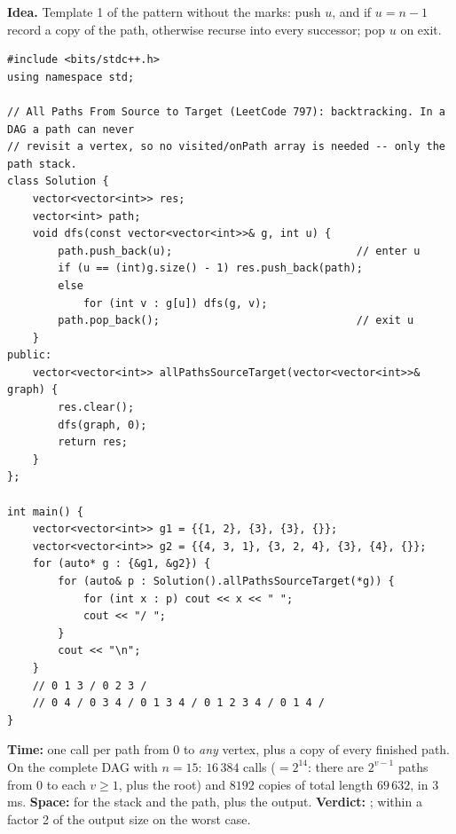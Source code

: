 \begin{algorithmbox}
\textbf{Idea.} Template 1 of the pattern without the marks: push $u$, and if $u = n-1$ record a copy of the path, otherwise recurse into every successor; pop $u$ on exit.

\begin{lstlisting}[style=cpp]
#include <bits/stdc++.h>
using namespace std;

// All Paths From Source to Target (LeetCode 797): backtracking. In a DAG a path can never
// revisit a vertex, so no visited/onPath array is needed -- only the path stack.
class Solution {
    vector<vector<int>> res;
    vector<int> path;
    void dfs(const vector<vector<int>>& g, int u) {
        path.push_back(u);                             // enter u
        if (u == (int)g.size() - 1) res.push_back(path);
        else
            for (int v : g[u]) dfs(g, v);
        path.pop_back();                               // exit u
    }
public:
    vector<vector<int>> allPathsSourceTarget(vector<vector<int>>& graph) {
        res.clear();
        dfs(graph, 0);
        return res;
    }
};

int main() {
    vector<vector<int>> g1 = {{1, 2}, {3}, {3}, {}};
    vector<vector<int>> g2 = {{4, 3, 1}, {3, 2, 4}, {3}, {4}, {}};
    for (auto* g : {&g1, &g2}) {
        for (auto& p : Solution().allPathsSourceTarget(*g)) {
            for (int x : p) cout << x << " ";
            cout << "/ ";
        }
        cout << "\n";
    }
    // 0 1 3 / 0 2 3 /
    // 0 4 / 0 3 4 / 0 1 3 4 / 0 1 2 3 4 / 0 1 4 /
}
\end{lstlisting}

\begin{complexitybox}
\textbf{Time:} one call per path from 0 to \emph{any} vertex, plus a copy of every finished path. On the complete DAG with $n = 15$: $16\,384$ calls ($= 2^{14}$: there are $2^{v-1}$ paths from 0 to each $v \ge 1$, plus the root) and $8192$ copies of total length $69\,632$, in 3\,ms. \textbf{Space:}  for the stack and the path, plus the output. \textbf{Verdict:} \ac{}; within a factor 2 of the output size on the worst case.
\end{complexitybox}
\end{algorithmbox}

